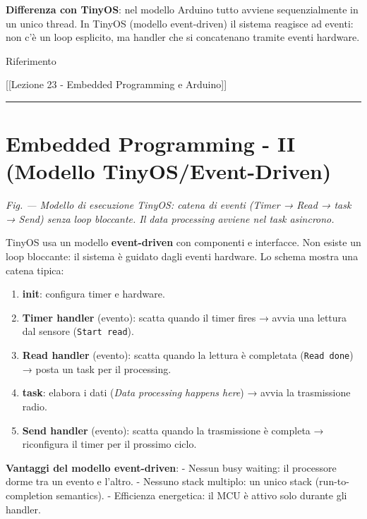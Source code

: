 \documentclass[
  italian,
  openany]{book}
\providecommand{\tightlist}{%
  \setlength{\itemsep}{0pt}\setlength{\parskip}{0pt}}
\begin{document}
\textbf{Differenza con TinyOS}: nel modello Arduino tutto avviene
sequenzialmente in un unico thread. In TinyOS (modello event-driven) il
sistema reagisce ad eventi: non c'è un loop esplicito, ma handler che si
concatenano tramite eventi hardware.

\begin{calloutnote}{Riferimento}

{[}{[}Lezione 23 - Embedded Programming e Arduino{]}{]}

\end{calloutnote}

\begin{center}\rule{0.5\linewidth}{0.5pt}\end{center}

\section{Embedded Programming - II (Modello
TinyOS/Event-Driven)}\label{embedded-programming---ii-modello-tinyosevent-driven}

\emph{Fig. --- Modello di esecuzione TinyOS: catena di eventi (Timer →
Read → task → Send) senza loop bloccante. Il data processing avviene nel
task asincrono.}

TinyOS usa un modello \textbf{event-driven} con componenti e interfacce.
Non esiste un loop bloccante: il sistema è guidato dagli eventi
hardware. Lo schema mostra una catena tipica:

\begin{enumerate}
\def\labelenumi{\arabic{enumi}.}
\tightlist
\item
  \textbf{init}: configura timer e hardware.
\item
  \textbf{Timer handler} (evento): scatta quando il timer fires → avvia
  una lettura dal sensore (\texttt{Start\ read}).
\item
  \textbf{Read handler} (evento): scatta quando la lettura è completata
  (\texttt{Read\ done}) → posta un task per il processing.
\item
  \textbf{task}: elabora i dati (\emph{Data processing happens here}) →
  avvia la trasmissione radio.
\item
  \textbf{Send handler} (evento): scatta quando la trasmissione è
  completa → riconfigura il timer per il prossimo ciclo.
\end{enumerate}

\textbf{Vantaggi del modello event-driven}: - Nessun busy waiting: il
processore dorme tra un evento e l'altro. - Nessuno stack multiplo: un
unico stack (run-to-completion semantics). - Efficienza energetica: il
MCU è attivo solo durante gli handler.
\end{document}
